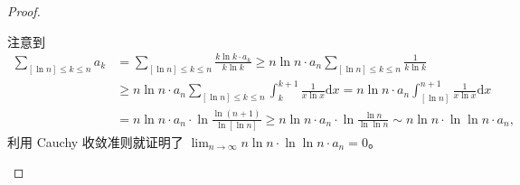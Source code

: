 \documentclass[../../main.tex]{subfiles}%
\begin{document}
\begin{proof}
\begin{enumerate}
注意到
\begin{align*}
\sum_{[\ln n] \leqslant k \leqslant n} a_k &= \sum_{[\ln n] \leqslant k \leqslant n} \frac{k \ln k \cdot a_k}{k \ln k} \geqslant n \ln n \cdot a_n \sum_{[\ln n] \leqslant k \leqslant n} \frac{1}{k \ln k} \\
&\geqslant n \ln n \cdot a_n \sum_{[\ln n] \leqslant k \leqslant n} \int_{k}^{k + 1} \frac{1}{x \ln x} \mathrm{d}x = n \ln n \cdot a_n \int_{[\ln n]}^{n + 1} \frac{1}{x \ln x} \mathrm{d}x \\
&= n \ln n \cdot a_n \cdot \ln \frac{\ln (n + 1)}{\ln [\ln n]} \geqslant n \ln n \cdot a_n \cdot \ln \frac{\ln n}{\ln \ln n} \sim n \ln n \cdot \ln \ln n \cdot a_n,
\end{align*}
利用 Cauchy 收敛准则就证明了 \( \lim_{n \to \infty} n \ln n \cdot \ln \ln n \cdot a_n = 0 \)。
\end{enumerate}

\end{proof}
\end{document}
